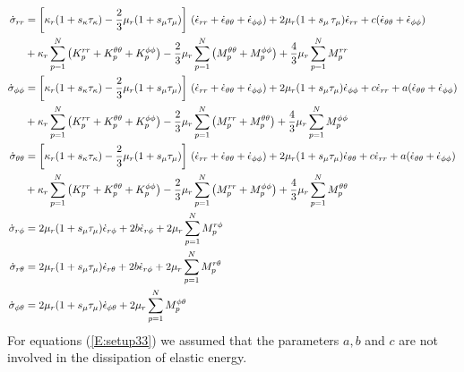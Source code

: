 \begin{subequations}\label{E:setup33}
\begin{align}
\dot{\sigma}_{rr}&=\left[\kappa_r
(1+s_\kappa \tau_\kappa)-\frac{2}{3}\mu_r(1+s_\mu \tau_\mu)\right]\,(\dot{\epsilon}_{rr}+\dot{\epsilon}_{\theta\theta}+\dot{\epsilon}_{\phi\phi})+2\mu_r(1+s_\mu\,\tau_\mu)\dot{\epsilon}_{rr}+c(\dot{\epsilon}_{\theta\theta}+\dot{\epsilon}_{\phi\phi})\notag\\
&+\kappa_r\sum_{p=1}^N \left(
K_{p}^{rr}+K_{p}^{\theta\theta}+K_{p}^{\phi\phi}\right)
-\frac{2}{3}\mu_r \sum_{p=1}^{N} \left(
M_p^{\theta\theta}+M_p^{\phi\phi} \right) + \frac{4}{3} \mu_r
\sum_{p=1}^{N} M_p^{rr}\\
\dot{\sigma}_{\phi\phi}&=\left[\kappa_r
(1+s_\kappa \tau_\kappa)-\frac{2}{3}\mu_r(1+s_\mu \tau_\mu)\right]\,(\dot{\epsilon}_{rr}+\dot{\epsilon}_{\theta\theta}+\dot{\epsilon}_{\phi\phi})+2\mu_r(1+s_\mu \tau_\mu)\dot{\epsilon}_{\phi\phi}+c\dot{\epsilon}_{rr}+a(\dot{\epsilon}_{\theta\theta}+\dot{\epsilon}_{\phi\phi})\notag\\
&+\kappa_r\sum_{p=1}^N \left(
K_{p}^{rr}+K_{p}^{\theta\theta}+K_{p}^{\phi\phi}\right)-\frac{2}{3}\mu_r
\sum_{p=1}^{N}
\left(M_p^{rr}+M_p^{\theta\theta}\right)+\frac{4}{3}\mu_r
\sum_{p=1}^{N} M_p^{\phi\phi}\\
\dot{\sigma}_{\theta\theta}&=\left[\kappa_r
(1+s_\kappa \tau_\kappa)-\frac{2}{3}\mu_r(1+s_\mu \tau_\mu)\right]\,(\dot{\epsilon}_{rr}+\dot{\epsilon}_{\theta\theta}+\dot{\epsilon}_{\phi\phi})+2\mu_r(1+s_\mu \tau_\mu)\dot{\epsilon}_{\theta\theta}+c\dot{\epsilon}_{rr}+a(\dot{\epsilon}_{\theta\theta}+\dot{\epsilon}_{\phi\phi})\notag\\
&+\kappa_r\sum_{p=1}^N \left(
K_{p}^{rr}+K_{p}^{\theta\theta}+K_{p}^{\phi\phi}\right)-\frac{2}{3}\mu_r
\sum_{p=1}^{N} \left(M_p^{rr}+M_p^{\phi\phi}\right)+\frac{4}{3}\mu_r
\sum_{p=1}^{N} M_p^{\theta\theta}\\
\dot{\sigma}_{r\phi}&=2\mu_r(1+s_\mu \tau_\mu)\dot{\epsilon}_{r\phi}+2b\dot{\epsilon}_{r\phi}+2\mu_r\sum_{p=1}^{N}
M_p^{r\phi}\\
\dot{\sigma}_{r\theta}&=2\mu_r(1+s_\mu \tau_\mu)\dot{\epsilon}_{r\theta}+2b\dot{\epsilon}_{r\phi}+2\mu_r\sum_{p=1}^{N}
M_p^{r\theta}\\
\dot{\sigma}_{\phi\theta}&=2\mu_r(1+s_\mu \tau_\mu)\dot{\epsilon}_{\phi\theta}+2\mu_r
\sum_{p=1}^{N} M_p^{\phi\theta}
\end{align}
\end{subequations}
For equations (\ref{E:setup33}) we assumed that the parameters $a,
b$ and $c$ are not involved in the dissipation of elastic energy.
